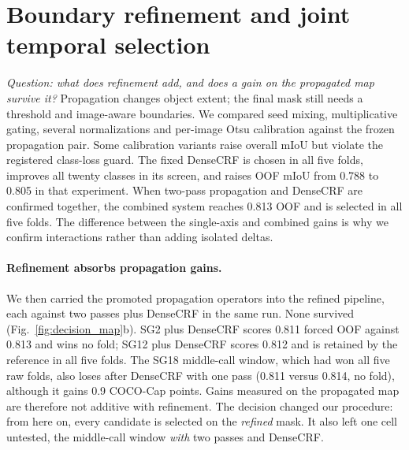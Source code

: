 \section{Boundary refinement and joint temporal selection}
\label{sec:fusion}
\emph{Question: what does refinement add, and does a gain on the propagated map survive it?} Propagation changes object extent; the final mask still needs a threshold and image-aware boundaries. We compared seed mixing, multiplicative gating, several normalizations and per-image Otsu calibration against the frozen propagation pair. Some calibration variants raise overall mIoU but violate the registered class-loss guard. The fixed DenseCRF is chosen in all five folds, improves all twenty classes in its screen, and raises OOF mIoU from 0.788 to 0.805 in that experiment. When two-pass propagation and DenseCRF are confirmed together, the combined system reaches 0.813 OOF and is selected in all five folds. The difference between the single-axis and combined gains is why we confirm interactions rather than adding isolated deltas.

\paragraph{Refinement absorbs propagation gains.}
We then carried the promoted propagation operators into the refined pipeline, each against two passes plus DenseCRF in the same run. None survived (Fig.~\ref{fig:decision_map}b). SG2 plus DenseCRF scores 0.811 forced OOF against 0.813 and wins no fold; SG12 plus DenseCRF scores 0.812 and is retained by the reference in all five folds. The SG18 middle-call window, which had won all five raw folds, also loses after DenseCRF with one pass (0.811 versus 0.814, no fold), although it gains 0.9 COCO-Cap points. Gains measured on the propagated map are therefore not additive with refinement. The decision changed our procedure: from here on, every candidate is selected on the \emph{refined} mask. It also left one cell untested, the middle-call window \emph{with} two passes and DenseCRF.

